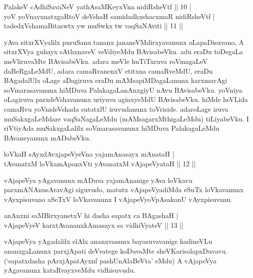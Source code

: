 \begin{shl}
PalakeV cAdhiSavaNeV yathAsaMKeyxVna nidiRsheVtf \hfill|| 10 | \\
yoV yoVnayxnatxgaRtoV deVshaH samidadhxshacxmaR nidiRsheVtf | \\
tadedxVshamaBitaswtx yw muSwkx tw vaqSaNAviti \hfill|| 11 || 
\end{shl}

\begin{artha}
yAva sitxrXVyalilx puruSanu tananx jananeVMdirxyavanunx oLapaDisuvano, 
A sitxrXVya guhayx sAthxnaveV veVdiyeMdu BAvisabeVku. adu eraDu toDegaLa 
meVliruvaMte BAvisabeVku. adara meVle huTiTxruva roVmagaLeV 
daBeRgaLeMdU, adara camaRvanenxV etitxna camaRveMdU, eraDu BAgadalUlx 
oLage aDagiruva eraDu mAMsapiMDagaLanunx karxmavAgi soVmarasavanunx 
hiMDuva PalakagaLanAnxgiyU nAvu BAvisabeVku. yoVniya oLagiruva 
parxdeVshavanunx uriyuva aginxyeMdU BAvisabeVku. hiMde heVLida camaRvu 
yoVnideVshada sutatxlU iruvudanunx toVriside. adaroLage iruva 
muSakxgaLeMdare vaqSaNagaLeMdu (mAMsagarxMthigaLeMdu) tiLiyabeVku. I 
riVtiyAda muSakxgaLalilx soVmarasavanunx hiMDuva PalakagaLeMdu 
BAvaneyanunx mADabeVku.
\end{artha}


\begin{shl}
loVkaH sAyxdAvxjapeVyeVna yajamAnasayx mAnataH | \\
tAvanatxM loVkamAponxVti yAvanatxM vAjapeVyataH \hfill|| 12 || 
\end{shl}

\begin{artha}
vAjapeVya yAgavanunx mADuva yajamAnanige yAva loVkavu 
parxmANAnusAravAgi siguvudo, matutx vAjapeVyadiMda eSuTx loVkavanunx 
vAyxpisuvano aSeTxV loVkavanunx I vAjapeVyoVpAsakanU vAyxpisuvanu.
\end{artha}


\begin{shl}
anAnxni saMBirxyanetxV hi dasha sapatx ca BAgashaH | \\
vAjapeVyeV karxtAvananxkAmasayx sa vidhiVyateV \hfill|| 13 || 
\end{shl}

\begin{artha}
vAjapeVya yAgadalilx elAlx ananxvanunx bayasuvavanige hadineVLu 
ananxgaLanunx parxjApati deVvatege koDuvaMte sheVKarisalapxDuvavu. 
(`sapatxdasha pArxjApatAyxnf pashUnAlaBeVta' eMdu) A vAjapeVya 
yAgavanunx kataRvayxveMdu vidhisuvudu.
\end{artha}


